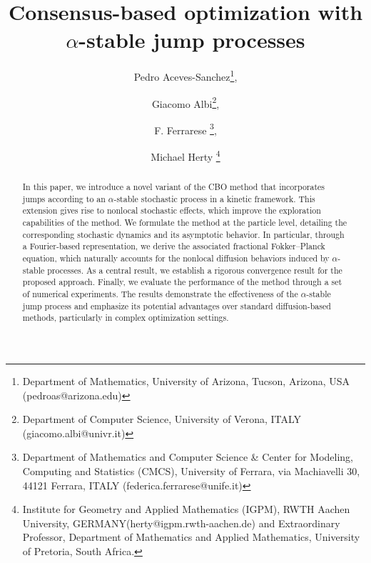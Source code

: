 \documentclass[11pt,handout]{article}%
\title{Consensus-based optimization with $\alpha$-stable jump processes}
\author{ 
Pedro  Aceves-Sanchez\thanks{Department of Mathematics, University of Arizona, Tucson, Arizona, USA 
	(pedroas@arizona.edu)},  \and Giacomo Albi\thanks{Department of Computer Science, University of Verona, ITALY (giacomo.albi@univr.it)}, \and F. Ferrarese \thanks{Department of Mathematics and Computer Science \& Center for Modeling, Computing and Statistics (CMCS), University of Ferrara, via Machiavelli 30, 44121 Ferrara, ITALY (federica.ferrarese@unife.it)}, \and Michael Herty \thanks{Institute for Geometry and Applied Mathematics (IGPM), RWTH Aachen University, GERMANY(herty@igpm.rwth-aachen.de) and
	Extraordinary Professor, Department of Mathematics and Applied Mathematics,  University of Pretoria, South Africa.}  
	}
\date{}
\numberwithin{equation}{section}
\theoremstyle{definition}
\begin{document}
\maketitle

\begin{abstract} 
	In this paper, we introduce a novel variant of the CBO method that incorporates jumps according to an $\alpha$-stable stochastic process in a kinetic framework. This extension gives rise to nonlocal stochastic effects, which improve the exploration capabilities of the method. We formulate the method at the particle level, detailing the corresponding stochastic dynamics and its asymptotic behavior. In particular, through a Fourier-based representation, we derive the associated fractional Fokker–Planck equation, which naturally accounts for the nonlocal diffusion behaviors induced by $\alpha$-stable processes. As a central result, we establish a rigorous convergence result for the proposed approach. Finally, we evaluate the performance of the method through a set of numerical experiments. The results demonstrate the effectiveness of the $\alpha$-stable jump process and emphasize its potential advantages over standard diffusion-based methods, particularly in complex optimization settings.
\end{abstract}
\end{document}
